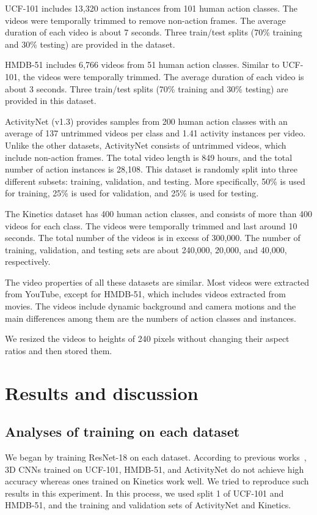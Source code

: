 \documentclass[10pt,twocolumn,letterpaper]{article}
\begin{document}
    UCF-101 includes 13,320 action instances from 101 human action classes.
    The videos were temporally trimmed to remove non-action frames.
    The average duration of each video is about 7 seconds.
    Three train/test splits (70\% training and 30\% testing) are provided in the dataset.

    HMDB-51 includes 6,766 videos from 51 human action classes.
    Similar to UCF-101, the videos were temporally trimmed.
    The average duration of each video is about 3 seconds.
    Three train/test splits (70\% training and 30\% testing) are provided in this dataset.

    ActivityNet (v1.3) provides samples from 200 human action classes with an average of 137 untrimmed videos per class and 1.41 activity instances per video.
    Unlike the other datasets, ActivityNet consists of untrimmed videos, which include non-action frames.
    The total video length is 849 hours,
    and the total number of action instances is 28,108.
    This dataset is randomly split into three different subsets:
    training, validation, and testing.
    More specifically, 50\% is used for training, 25\% is used for validation, and 25\% is used for testing.

    The Kinetics dataset has 400 human action classes,
    and consists of more than 400 videos for each class.
    The videos were temporally trimmed and last around 10 seconds.
    The total number of the videos is in excess of 300,000.
    The number of training, validation, and testing sets are about
    240,000, 20,000, and 40,000, respectively.

    The video properties of all these datasets are similar.
    Most videos were extracted from YouTube, except for HMDB-51,
    which includes videos extracted from movies.
    The videos include dynamic background and camera motions and
    the main differences among them are the numbers of action classes and instances.

    We resized the videos to heights of 240 pixels without changing their aspect ratios and then stored them.

\section{Results and discussion}\label{sec:exp}
  \subsection{Analyses of training on each dataset}\label{sec:exp_resnet18}
    We began by training ResNet-18 on each dataset.
    According to previous works~\cite{Hara_2017_ICCV_Workshops,Kinetics},
    3D CNNs trained on UCF-101, HMDB-51, and ActivityNet do not achieve high accuracy
    whereas ones trained on Kinetics work well.
    We tried to reproduce such results in this experiment.
    In this process, we used split 1 of UCF-101 and HMDB-51,
    and the training and validation sets of ActivityNet and Kinetics.
\end{document}
